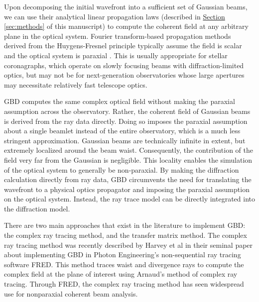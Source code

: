 Upon decomposing the initial wavefront into a sufficient set of Gaussian beams, we can use their analytical linear propagation laws\cite{Siegman_1986} (described in \hyperref[sec:methods]{Section \ref{sec:methods}} of this manuscript) to compute the coherent field at any arbitrary plane in the optical system. Fourier transform-based propagation methods derived from the Huygens-Fresnel principle typically assume the field is scalar and the optical system is paraxial \cite{goodman17}. This is usually appropriate for stellar coronagraphs, which operate on slowly focusing beams with diffraction-limited optics, but may not be for next-generation observatories whose large apertures may necessitate relatively fast telescope optics.

GBD  computes the same complex optical field without making the paraxial assumption across the observatory. Rather, the coherent field of  Gaussian beams is derived from the ray data directly. Doing so imposes the paraxial assumption about a single beamlet instead of the entire observatory, which is a much less stringent approximation. Gaussian beams are technically infinite in extent, but extremely localized around the beam waist. Consequently, the contribution of the field very far from the Gaussian is negligible. This locality enables the simulation of the optical system to generally be non-paraxial. By making the diffraction calculation directly from ray data, GBD circumvents the need for translating the wavefront to a physical optics propagator and imposing the paraxial assumption on the optical system. Instead, the ray trace model can be directly integrated into the diffraction model. 

There are two main approaches that exist in the literature to implement GBD: the complex ray tracing method, and the transfer matrix method. The complex ray tracing method was recently described by Harvey et al\cite{Harvey15} in their seminal paper about implementing GBD in Photon Engineering's non-sequential ray tracing software FRED. This method traces waist and divergence rays to compute the complex field at the plane of interest using Arnaud's method of complex ray tracing\cite{arnaud_representation_1985,Greynolds86}. Through FRED, the complex ray tracing method has seen widespread use for nonparaxial coherent beam analysis.

